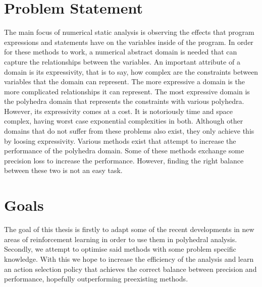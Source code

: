 \section{Problem Statement}
The main focus of numerical static analysis is observing the effects that program expressions and statements have on the variables inside of the program. In order for these methods to work, a numerical abstract domain is needed that can capture the relationships between the variables. An important attribute of a domain is its expressivity, that is to say, how complex are the constraints between variables that the domain can represent. The more expressive a domain is the more complicated relationships it can represent. The most expressive domain is the polyhedra domain that represents the constraints with various polyhedra. However, its expressivity comes at a cost. It is notoriously time and space complex, having worst case exponential complexities in both. Although other domains that do not suffer from these problems also exist, they only achieve this by loosing expressivity. Various methods exist that attempt to increase the performance of the polyhedra domain. Some of these methods exchange some precision loss to increase the performance. However, finding the right balance between these two is not an easy task.

\section{Goals}
The goal of this thesis is firstly to adapt some of the recent developments in new areas of reinforcement learning in order to use them in polyhedral analysis. Secondly, we attempt to optimise said methods with some problem specific knowledge. With this we hope to increase the efficiency of the analysis and learn an action selection policy that achieves the correct balance between precision and performance, hopefully outperforming preexisting methods.

